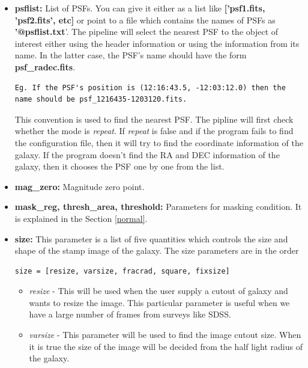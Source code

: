 \documentclass[a4paper,10pt]{article}
\begin{document}
\begin{itemize}
\item \textbf{psflist:} List of PSFs. You can give it either as a list like \textbf{['psf1.fits, 'psf2.fits', etc]} or point to a file which contains the names of PSFs as \textbf{'@psflist.txt}'. The pipeline will select the nearest PSF to the object of interest either using the header information or using the information from its name. In the latter case, the PSF's name should have the form \textbf{ psf\_radec.fits}.
\begin{verbatim}Eg. If the PSF's position is (12:16:43.5, -12:03:12.0) then the 
name should be psf_1216435-1203120.fits.
\end{verbatim}
This convention is used to find the nearest PSF. The pipline will first check whether the mode is \textit{repeat}. If \textit{repeat} is false and if the program fails to find the configuration file, then it will try to find the coordinate information of the galaxy. If the program doesn't find the RA and DEC information of the galaxy, then it chooses the PSF one by one from the list.

\item \textbf{mag\_zero:} Magnitude zero point.

\item \textbf{mask\_reg, thresh\_area, threshold:} Parameters for masking condition. It is explained in the Section \ref{normal}.

\item \textbf{size:} This parameter is a list of five quantities which controls the size and shape of the stamp image of the galaxy. The size parameters are in the order
\begin{verbatim}
size = [resize, varsize, fracrad, square, fixsize]
\end{verbatim}
\begin{itemize}
\item \textit{resize} - This will be used when the user supply a cutout of galaxy and
 wants to resize the image. This particular parameter is useful when
 we have a large number of frames from surveys like
 SDSS.

\item \textit{varsize} - This parameter will be used to find the image
 cutout size. When it is true the size of the image will be decided from the half light radius of the galaxy.


\end{itemize}
\end{itemize}
\end{document}
